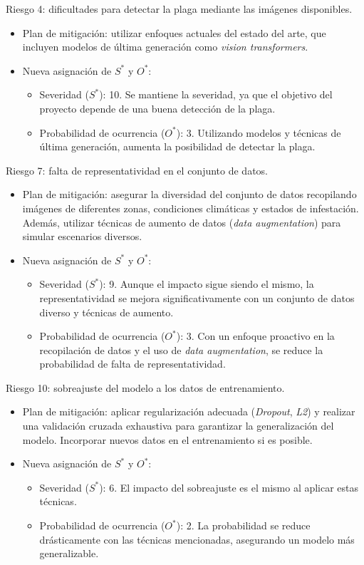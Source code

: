 \documentclass[
11pt, %
]{charter}
\begin{document}
Riesgo 4: dificultades para detectar la plaga mediante las imágenes disponibles.
\begin{itemize}
  \item Plan de mitigación: utilizar enfoques actuales del estado del arte, que incluyen modelos de última generación como \textit{vision transformers}.
  \item Nueva asignación de $S^*$ y $O^*$:
        \begin{itemize}
          \item Severidad ($S^*$): 10. Se mantiene la severidad, ya que el objetivo del proyecto depende de una buena detección de la plaga.
          \item Probabilidad de ocurrencia ($O^*$): 3. Utilizando modelos y técnicas de última generación, aumenta la posibilidad de detectar la plaga.
        \end{itemize}
\end{itemize}

Riesgo 7: falta de representatividad en el conjunto de datos.
\begin{itemize}
  \item Plan de mitigación: asegurar la diversidad del conjunto de datos recopilando imágenes de diferentes zonas, condiciones climáticas y estados de infestación. Además, utilizar técnicas de aumento de datos (\textit{data augmentation}) para simular escenarios diversos.
  \item Nueva asignación de $S^*$ y $O^*$:
        \begin{itemize}
          \item Severidad ($S^*$): 9. Aunque el impacto sigue siendo el mismo, la representatividad se mejora significativamente con un conjunto de datos diverso y técnicas de aumento. \item Probabilidad de ocurrencia ($O^*$): 3. Con un enfoque proactivo en la recopilación de datos y el uso de \textit{data augmentation}, se reduce la probabilidad de falta de representatividad. \end{itemize}
\end{itemize}

Riesgo 10: sobreajuste del modelo a los datos de entrenamiento.
\begin{itemize}
  \item Plan de mitigación: aplicar regularización adecuada (\textit{Dropout}, \textit{L2}) y realizar una validación cruzada exhaustiva para garantizar la generalización del modelo. Incorporar nuevos datos en el entrenamiento si es posible.
  \item Nueva asignación de $S^*$ y $O^*$:
        \begin{itemize}
          \item Severidad ($S^*$): 6. El impacto del sobreajuste es el mismo al aplicar estas técnicas.
          \item Probabilidad de ocurrencia ($O^*$): 2. La probabilidad se reduce drásticamente con las técnicas mencionadas, asegurando un modelo más generalizable.
        \end{itemize}
\end{itemize}
\end{document}
